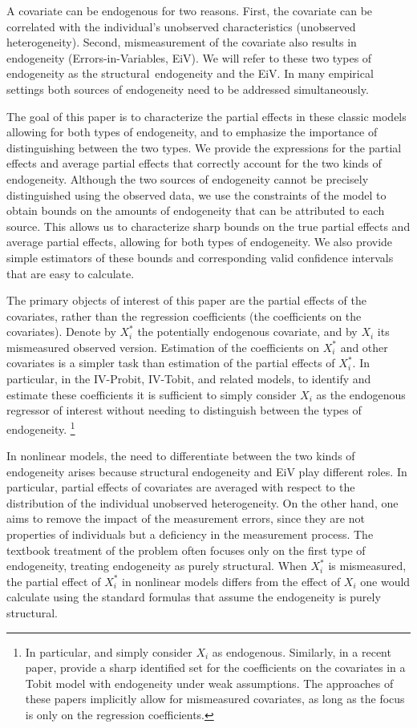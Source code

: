 \documentclass[12pt]{article}
\begin{document}
A covariate can be endogenous for two reasons. First, the covariate can be
correlated with the individual's unobserved characteristics (unobserved
heterogeneity). Second, mismeasurement of the covariate also results in
endogeneity (Errors-in-Variables, EiV). We will refer to these two types of
endogeneity as the structural\ endogeneity and the EiV. In many empirical
settings both sources of endogeneity need to be addressed simultaneously.

The goal of this paper is to characterize the partial effects in these
classic models allowing for both types of endogeneity, and to emphasize the
importance of distinguishing between the two types. We provide the
expressions for the partial effects and average partial effects that
correctly account for the two kinds of endogeneity. Although the two sources
of endogeneity cannot be precisely distinguished using the observed data, we
use the constraints of the model to obtain bounds on the amounts of
endogeneity that can be attributed to each source. This allows us to
characterize sharp bounds on the true partial effects and average partial effects,
allowing for both types of endogeneity. We also provide simple estimators of
these bounds and corresponding valid confidence intervals that are easy to
calculate.

The primary objects of interest of this paper are the partial effects of the
covariates, rather than the regression coefficients (the coefficients on the
covariates). Denote by $X_{i}^{\ast }$ the potentially endogenous covariate, %
 and by $X_{i}$ its mismeasured observed version. Estimation of the coefficients on $%
X_{i}^{\ast }$ and other covariates is a simpler task than estimation of the
partial effects of $X_{i}^{\ast }$. In particular, in the IV-Probit,
IV-Tobit, and related models, to identify and estimate these coefficients it
is sufficient to simply consider $X_{i}$ as the endogenous regressor of
interest without needing to distinguish between the types of endogeneity.%
\footnote{%
In particular, \cite{SmithBlundell1986Ecta} and \cite{RiversVuong1988JoE}
simply consider $X_{i}$ as endogenous. Similarly, in a recent paper, \cite%
{ChesherKimRosen2023JoE} provide a sharp identified set for the coefficients
on the covariates in a Tobit model with endogeneity under weak assumptions.
The approaches of these papers implicitly allow for mismeasured covariates,
as long as the focus is only on the regression coefficients.} %

In nonlinear models, the need to differentiate between the two kinds of
endogeneity arises because structural endogeneity and EiV play different
roles. In particular, partial effects of covariates are averaged with
respect to the distribution of the individual unobserved heterogeneity. On
the other hand, one aims to remove the impact of the measurement errors,
since they are not properties of individuals but a deficiency in the
measurement process. The textbook treatment of the problem often focuses
only on the first type of endogeneity, treating endogeneity as purely
structural. When $X_{i}^{\ast }$ is mismeasured, the partial effect of $%
X_{i}^{\ast }$ in nonlinear models differs from the effect of $X_{i}$ one
would calculate using the standard formulas that assume the endogeneity is
purely structural.{}
\end{document}
